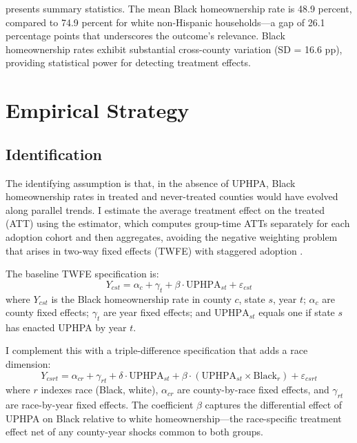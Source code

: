 \documentclass[12pt]{article}
\begin{document}


 presents summary statistics. The mean Black homeownership rate is 48.9 percent, compared to 74.9 percent for white non-Hispanic households---a gap of 26.1 percentage points that underscores the outcome's relevance. Black homeownership rates exhibit substantial cross-county variation (SD = 16.6 pp), providing statistical power for detecting treatment effects.

\section{Empirical Strategy}

\subsection{Identification}

The identifying assumption is that, in the absence of UPHPA, Black homeownership rates in treated and never-treated counties would have evolved along parallel trends. I estimate the average treatment effect on the treated (ATT) using the \citet{callaway2021} estimator, which computes group-time ATTs separately for each adoption cohort and then aggregates, avoiding the negative weighting problem that arises in two-way fixed effects (TWFE) with staggered adoption \citep{goodmanbacon2021, dechaisemartin2020}.

The baseline TWFE specification is:
\begin{equation}
Y_{cst} = \alpha_c + \gamma_t + \beta \cdot \text{UPHPA}_{st} + \varepsilon_{cst}
\end{equation}
where $Y_{cst}$ is the Black homeownership rate in county $c$, state $s$, year $t$; $\alpha_c$ are county fixed effects; $\gamma_t$ are year fixed effects; and $\text{UPHPA}_{st}$ equals one if state $s$ has enacted UPHPA by year $t$.

I complement this with a triple-difference specification that adds a race dimension:
\begin{equation}
Y_{csrt} = \alpha_{cr} + \gamma_{rt} + \delta \cdot \text{UPHPA}_{st} + \beta \cdot (\text{UPHPA}_{st} \times \text{Black}_r) + \varepsilon_{csrt}
\end{equation}
where $r$ indexes race (Black, white), $\alpha_{cr}$ are county-by-race fixed effects, and $\gamma_{rt}$ are race-by-year fixed effects. The coefficient $\beta$ captures the differential effect of UPHPA on Black relative to white homeownership---the race-specific treatment effect net of any county-year shocks common to both groups.
\end{document}

